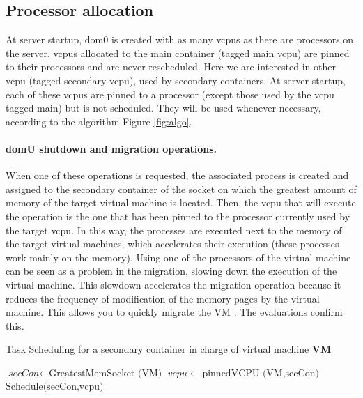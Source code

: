\subsection{Processor allocation}
At server startup, dom0 is created with as many \acrshort{vcpu}s as there are processors on the server. \acrshort{vcpu}s allocated to the main container (tagged main \acrshort{vcpu}) are pinned to their processors and are never rescheduled. Here we are interested in other \acrshort{vcpu} (tagged secondary \acrshort{vcpu}), used by secondary containers. At server startup, each of these \acrshort{vcpu}s are pinned to a processor (except those used by the \acrshort{vcpu} tagged main) but is not scheduled. They will be used whenever necessary, according to the algorithm Figure \ref{fig:algo}.

\paragraph{domU shutdown and migration operations.} When one of these operations is requested, the associated process is created and assigned to the secondary container of the socket on which the greatest amount of memory of the target virtual machine is located. Then, the \acrshort{vcpu} that will execute the operation is the one that has been pinned to the processor currently used by the target \acrshort{vcpu}. In this way, the processes are executed next to the memory of the target virtual machines, which accelerates their execution (these processes work mainly on the memory). Using one of the processors of the virtual machine can be seen as a problem in the migration, slowing down the execution of the virtual machine. This slowdown accelerates the migration operation because it reduces the frequency of modification of the memory pages by the virtual machine. This allows you to quickly migrate the VM \citep{livemigration,livemigration2}. The evaluations confirm this.

\begin{algorithm}
\caption{Task Scheduling for a secondary container in charge of virtual machine \textbf{VM}}
\begin{algorithmic}[1]
\State $\textit{secCon} \gets \text{GreatestMemSocket (VM)}$ 
\State $vcpu \gets \text{pinnedVCPU (VM,secCon)}$ 
\State $\text{Schedule(secCon,vcpu)}$ 
\EndProcedure
\end{algorithmic}
\end{algorithm}

